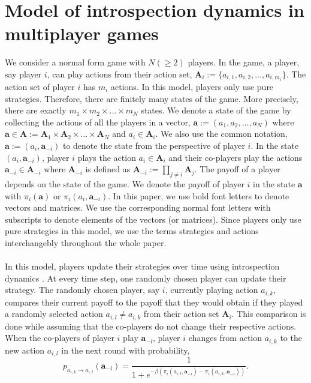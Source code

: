 \documentclass[11pt]{article}
\theoremstyle{plainCl1}
\theoremstyle{plainCl2}
\newcommand{\A}{\mathbf{A}}
\newcommand{\abf}{\mathbf{a}}
\begin{document}
\section{Model of introspection dynamics in multiplayer games}
We consider a normal form game with $N (\geq 2)$ players. In the game, a player, say player $i$, can play actions from their action set, $\A_i := \{a_{i,1}, a_{i,2}, ..., a_{i,m_i} \}$. The action set of player $i$ has $m_i$ actions. In this model, players only use pure strategies. Therefore, there are finitely many states of the game. More precisely, there are exactly $m_1 \times m_2 \times ... \times m_N$ states. We denote a state of the game by collecting the actions of all the players in a vector, $\abf := (a_1, a_2, ..., a_N)$ where $\abf \in \A := \A_1 \times \A_2 \times ... \times \A_N$ and $a_i \in \A_i$. We also use the common notation, $\abf := (a_i, \abf_{-i})$ to denote the state from the perspective of player $i$. In the state $(a_i, \abf_{-i})$, player $i$ plays the action $a_i \in \A_i$ and their co-players play the actions $\abf_{-i} \in \A_{-i}$ where $\A_{-i}$ is defined as $\A_{-i}:= \prod_{j \neq i} \A_j$. The payoff of a player depends on the state of the game. We denote the payoff of player $i$ in the state $\abf$ with $\pi_i(\abf)$ or $\pi_i(a_i, \abf_{-i})$. In this paper, we use bold font letters to denote vectors and matrices. We use the corresponding normal font letters with subscripts to denote elements of the vectors (or matrices). Since players only use pure strategies in this model, we use the terms strategies and actions interchangebly throughout the whole paper. \\ \\ 
\noindent In this model, players update their strategies over time using introspection dynamics \cite{Couto:NJP:2022}. At every time step, one randomly chosen player can update their strategy. The randomly chosen player, say $i$, currently playing  action $a_{i,k}$, compares their current payoff to the payoff that they would obtain if they played a randomly selected action $a_{i,l} \neq a_{i,k}$ from their action set $\A_i$. This comparison is done while assuming that the co-players do not change their respective actions. When the co-players of player $i$ play $\abf_{-i}$, player $i$ changes from action $a_{i,k}$ to the new action $a_{i,l}$ in the next round with probability, \\
\begin{equation}
 p_{a_{i,k} \to a_{i,l}} (\abf_{-i})= \frac{1}{1 + e^{\displaystyle -\beta(\pi_i(a_{i,l}, \abf_{-i}) - \pi_i(a_{i,k}, \abf_{-i}))}} .
 \label{Eq:introspection-update}
\end{equation}
\end{document}
